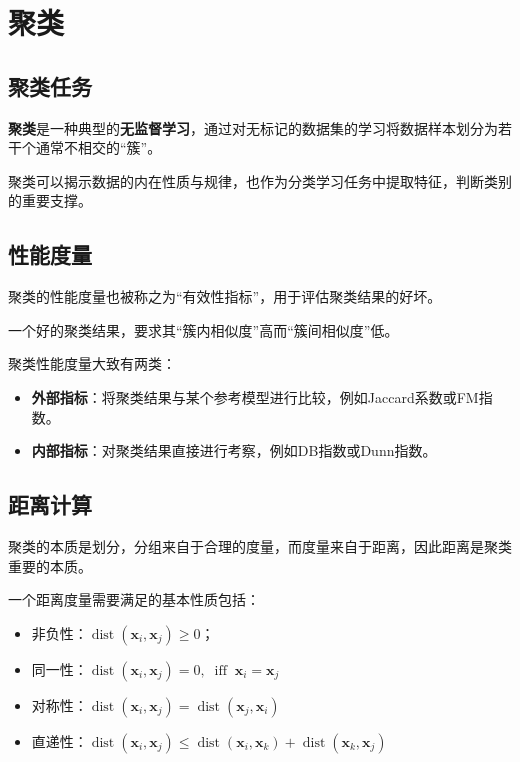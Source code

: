 \chapter{聚类}

\section{聚类任务}\label{sec:9.1}
\textbf{聚类}是一种典型的\textbf{无监督学习}，通过对无标记的数据集的学习将数据样本划分为若干个通常不相交的“簇”。

聚类可以揭示数据的内在性质与规律，也作为分类学习任务中提取特征，判断类别的重要支撑。

\section{性能度量}\label{sec:9.2}

聚类的性能度量也被称之为“有效性指标”，用于评估聚类结果的好坏。

一个好的聚类结果，要求其“簇内相似度”高而“簇间相似度”低。

聚类性能度量大致有两类：
\begin{itemize}
    \item \textbf{外部指标}：将聚类结果与某个参考模型进行比较，例如Jaccard系数或FM指数。
    \item \textbf{内部指标}：对聚类结果直接进行考察，例如DB指数或Dunn指数。
\end{itemize}

\section{距离计算}\label{sec:9.3}
聚类的本质是划分，分组来自于合理的度量，而度量来自于距离，因此距离是聚类重要的本质。

一个距离度量需要满足的基本性质包括：
\begin{itemize}
    \item 非负性：$\operatorname{dist}(\boldsymbol x_i,\boldsymbol x_j) \ge 0$；
    \item 同一性：$\operatorname{dist}(\boldsymbol x_i, \boldsymbol x_j) = 0, \; \operatorname{iff} \;\boldsymbol x_i = \boldsymbol x_j$
    \item 对称性：$\operatorname{dist}(\boldsymbol x_i, \boldsymbol x_j) = \operatorname{dist}(\boldsymbol x_j, \boldsymbol x_i)$
    \item 直递性：$\operatorname{dist}(\boldsymbol x_i, \boldsymbol x_j) \le \operatorname{dist}(\boldsymbol x_i, \boldsymbol x_k) + \operatorname{dist}(\boldsymbol x_k, \boldsymbol x_j)$
\end{itemize}

